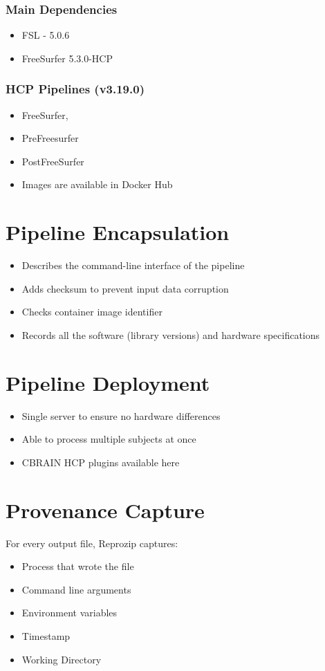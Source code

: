 \subsubsection{Main Dependencies}
\begin{itemize}
  \item FSL - 5.0.6
  \item FreeSurfer 5.3.0-HCP
\end{itemize}

\subsubsection{HCP Pipelines (v3.19.0)}
\begin{itemize}
  \item FreeSurfer,
  \item PreFreesurfer
  \item PostFreeSurfer
  \item Images are available in Docker Hub
\end{itemize}

\section{Pipeline Encapsulation}
\begin{itemize}
  \item Describes the command-line interface of the pipeline
  \item Adds checksum to prevent input data corruption
  \item Checks container image identifier
  \item Records all the software (library versions) and hardware specifications
\end{itemize}


\section{Pipeline Deployment}
\begin{itemize}
  \item Single server to ensure no hardware differences
  \item Able to process multiple subjects at once
  \item CBRAIN HCP plugins available here
\end{itemize}

\section{Provenance Capture}
\begin{flushleft}
For every output file, Reprozip captures: 
\end{flushleft}
\begin{itemize}
  \item Process that wrote the file
  \item Command line arguments
  \item Environment variables
  \item Timestamp
  \item Working Directory
\end{itemize}

